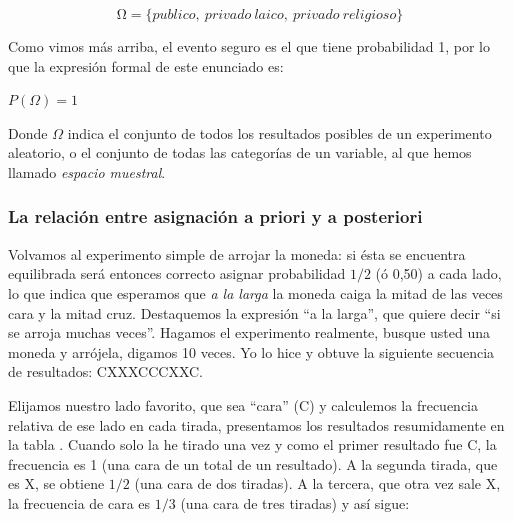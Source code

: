\documentclass[]{article}
\begin{document}
\[\mathrm{\Omega} = \{ publico,\ privado\ laico,\ privado\ religioso\}\]

Como vimos más arriba, el evento seguro es el que tiene probabilidad 1,
por lo que la expresión formal de este enunciado es:

\(P(\Omega) = 1\)

Donde \(\Omega\) indica el conjunto de todos los resultados posibles de
un experimento aleatorio, o el conjunto de todas las categorías de un
variable, al que hemos llamado \emph{espacio muestral}.

\hypertarget{la-relaciuxf3n-entre-asignaciuxf3n-a-priori-y-a-posteriori}{%
\subsubsection{La relación entre asignación a priori y a
posteriori}\label{la-relaciuxf3n-entre-asignaciuxf3n-a-priori-y-a-posteriori}}

Volvamos al experimento simple de arrojar la moneda: si ésta se
encuentra equilibrada será entonces correcto asignar probabilidad
\(1/2\) (ó 0,50) a cada lado, lo que indica que esperamos que \emph{a la
larga} la moneda caiga la mitad de las veces cara y la mitad cruz.
Destaquemos la expresión ``a la larga'', que quiere decir ``si se arroja
muchas veces''. Hagamos el experimento realmente, busque usted una
moneda y arrójela, digamos 10 veces. Yo lo hice y obtuve la siguiente
secuencia de resultados: CXXXCCCXXC.

Elijamos nuestro lado favorito, que sea ``cara'' (C) y calculemos la
frecuencia relativa de ese lado en cada tirada, presentamos los
resultados resumidamente en la tabla . Cuando solo la he tirado una vez
y como el primer resultado fue C, la frecuencia es 1 (una cara de un
total de un resultado). A la segunda tirada, que es X, se obtiene
\(1/2\) (una cara de dos tiradas). A la tercera, que otra vez sale X, la
frecuencia de cara es \(1/3\) (una cara de tres tiradas) y así sigue:
\end{document}

